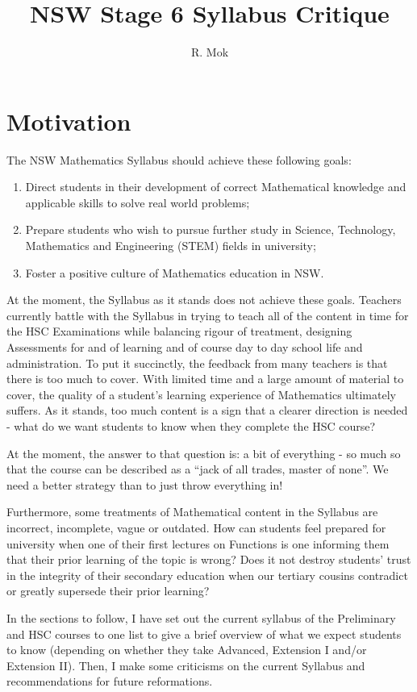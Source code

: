 \documentclass[11pt, a4paper, oneside]{article}
\title{NSW Stage 6 Syllabus Critique}
\author{R. Mok
}
\date{}
\begin{document}
\maketitle

\section{Motivation}
The NSW Mathematics Syllabus should achieve these following goals:
\begin{enumerate}
  \item Direct students in their development of correct Mathematical knowledge and applicable skills to solve real world problems;
  \item Prepare students who wish to pursue further study in Science, Technology, Mathematics and Engineering (STEM) fields in university;
  \item Foster a positive culture of Mathematics education in NSW.
\end{enumerate}
At the moment, the Syllabus as it stands does not achieve these goals. Teachers currently battle with the Syllabus in trying to teach all of the content in time for the HSC Examinations while balancing rigour of treatment, designing Assessments for and of learning and of course day to day school life and administration. To put it succinctly, the feedback from many teachers is that there is too much to cover. With limited time and a large amount of material to cover, the quality of a student's learning experience of Mathematics ultimately suffers. As it stands, too much content is a sign that a clearer direction is needed - what do we want students to know when they complete the HSC course?

At the moment, the answer to that question is: a bit of everything - so much so that the course can be described as a ``jack of all trades, master of none''. We need a better strategy than to just throw everything in!

Furthermore, some treatments of Mathematical content in the Syllabus are incorrect, incomplete, vague or outdated. How can students feel prepared for university when one of their first lectures on Functions is one informing them that their prior learning of the topic is wrong? Does it not destroy students' trust in the integrity of their secondary education when our tertiary cousins contradict or greatly supersede their prior learning?

In the sections to follow, I have set out the current syllabus of the Preliminary and HSC courses to one list to give a brief overview of what we expect students to know (depending on whether they take Advanced, Extension I and/or Extension II). Then, I make some criticisms on the current Syllabus and recommendations for future reformations.
\end{document}
